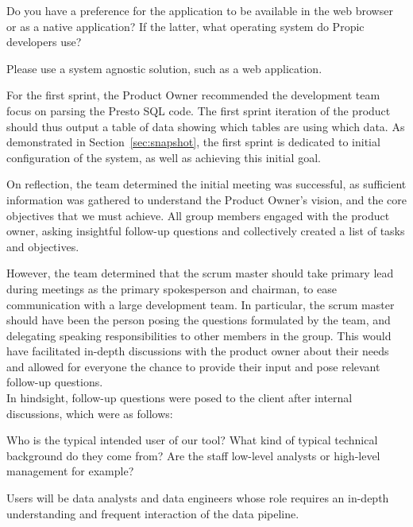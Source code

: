\begin{spacing}{1.3}
\begin{QandA}
    \item Do you have a preference for the application to be available in the web browser or as a native application? If the latter, what operating system do Propic developers use?
        \begin{answered}
            Please use a system agnostic solution, such as a web application.
        \end{answered}
\end{QandA}

For the first sprint, the Product Owner recommended the development team focus on parsing the Presto SQL code. The first sprint iteration of the product should thus output a table of data showing which tables are using which data. As demonstrated in Section~\ref{sec:snapshot}, the first sprint is dedicated to initial configuration of the system, as well as achieving this initial goal. \\
\vspace{-5pt}

On reflection, the team determined the initial meeting was successful, as sufficient information was gathered to understand the Product Owner's vision, and the core objectives that we must achieve. All group members engaged with the product owner, asking insightful follow-up questions and collectively created a list of tasks and objectives. \\ \vspace{-5pt}

However, the team determined that the scrum master should take primary lead during meetings as the primary spokesperson and chairman, to ease communication with a large development team. In particular, the scrum master should have been the person posing the questions formulated by the team, and delegating speaking responsibilities to other members in the group. This would have facilitated in-depth discussions with the product owner about their needs and allowed for everyone the chance to provide their input and pose relevant follow-up questions. \\

In hindsight, follow-up questions were posed to the client after internal discussions, which were as follows:
\begin{QandA}
    \item Who is the typical intended user of our tool? What kind of typical technical background do they come from? Are the staff low-level analysts or high-level management for example?
    \begin{answered}
        Users will be data analysts and data engineers whose role requires an in-depth understanding and frequent interaction of the data pipeline.
    \end{answered}
    

\end{QandA}
\end{spacing}
